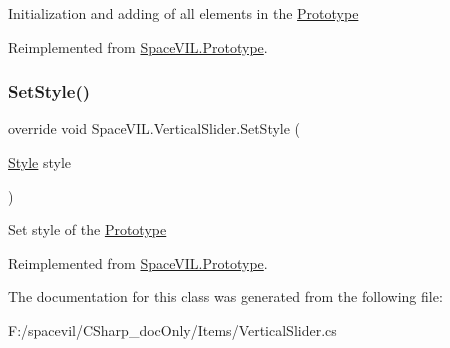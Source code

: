 Initialization and adding of all elements in the \mbox{\hyperlink{class_space_v_i_l_1_1_prototype}{Prototype}} 



Reimplemented from \mbox{\hyperlink{class_space_v_i_l_1_1_prototype_ac3379fe02923ee155b5b0084abf27420}{Space\+V\+I\+L.\+Prototype}}.

\mbox{\label{class_space_v_i_l_1_1_vertical_slider_af6e1f3b91c48cecf0bd791c787d3fe0d}} 
\subsubsection{\texorpdfstring{Set\+Style()}{SetStyle()}}
{\footnotesize\ttfamily override void Space\+V\+I\+L.\+Vertical\+Slider.\+Set\+Style (\begin{DoxyParamCaption}\item[{\mbox{\hyperlink{class_space_v_i_l_1_1_decorations_1_1_style}{Style}}}]{style }\end{DoxyParamCaption})\hspace{0.3cm}{\ttfamily [virtual]}}



Set style of the \mbox{\hyperlink{class_space_v_i_l_1_1_prototype}{Prototype}} 



Reimplemented from \mbox{\hyperlink{class_space_v_i_l_1_1_prototype_ae96644a6ace490afb376fb542161e541}{Space\+V\+I\+L.\+Prototype}}.



The documentation for this class was generated from the following file\+:\begin{DoxyCompactItemize}
\item 
F\+:/spacevil/\+C\+Sharp\+\_\+doc\+Only/\+Items/Vertical\+Slider.\+cs\end{DoxyCompactItemize}
